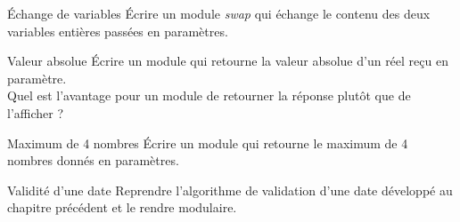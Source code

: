 \begin{Exercice}{Échange de variables}
Écrire un module \textit{swap} qui échange le contenu des deux variables
entières passées en paramètres.
\end{Exercice}

\begin{Exercice}{Valeur absolue}
Écrire un module qui retourne la valeur absolue d'un
réel reçu en paramètre.
\\Quel est l'avantage pour un module de retourner la réponse 
plutôt que de l'afficher ?
\end{Exercice}

\begin{Exercice}{Maximum de 4 nombres}
Écrire un module qui retourne le maximum de 4
nombres donnés en paramètres.
\end{Exercice}

\begin{Exercice}{Validité d'une date}
Reprendre l'algorithme de validation d'une date 
développé au chapitre précédent et le rendre modulaire.
\end{Exercice}


